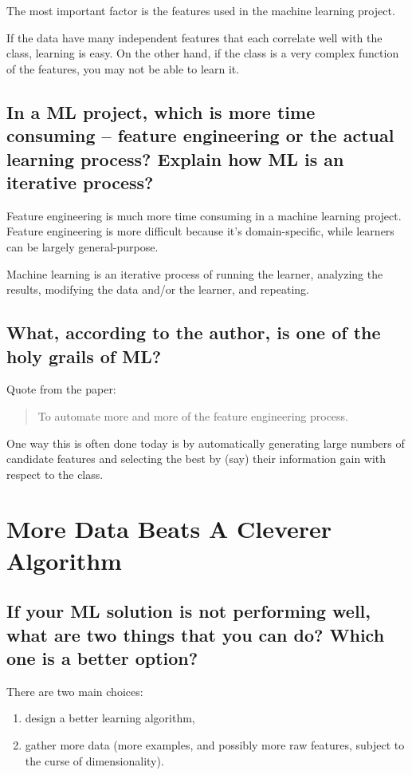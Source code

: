 \documentclass[10pt]{article}
\begin{document}
The most important factor is the features used in the machine learning project.

If the data have many independent features that each correlate well with the
class, learning is easy. On the other hand, if the class is a very complex
function of the features, you may not be able to learn it.

\subsection{In a ML project, which is more time consuming – feature engineering
or the actual learning process? Explain how ML is an iterative process?}

Feature engineering is much more time consuming in a machine learning project.
Feature engineering is more difficult because it’s domain-specific, while
learners can be largely general-purpose.

Machine learning is an iterative process of running the learner, analyzing the
results, modifying the data and/or the learner, and repeating.

\subsection{What, according to the author, is one of the holy grails of ML?}

Quote from the paper:

\begin{quote}
    To automate more and more of the feature engineering process.
\end{quote}

One way this is often done today is by automatically generating large numbers
of candidate features and selecting the best by (say) their information gain
with respect to the class.

\section{More Data Beats A Cleverer Algorithm}

\subsection{If your ML solution is not performing well, what are two things
that you can do? Which one is a better option?}

There are two main choices:

\begin{enumerate}
    \item design a better learning algorithm,
    \item gather more data (more examples, and possibly more raw features,
        subject to the curse of dimensionality).
\end{enumerate}
\end{document}
